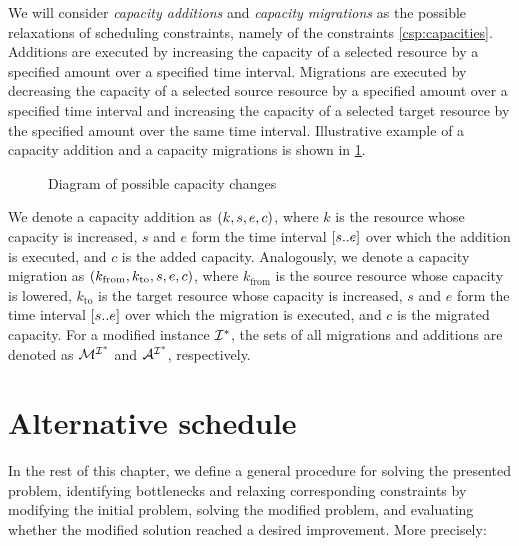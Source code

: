 We will consider \emph{capacity additions} and \emph{capacity migrations} as the possible relaxations
of scheduling constraints, namely of the constraints \eqref{csp:capacities}.
Additions are executed by increasing the capacity of a selected resource
by a specified amount over a specified time interval.
Migrations are executed by decreasing the capacity of a selected source resource
by a specified amount over a specified time interval
and increasing the capacity of a selected target resource
by the specified amount over the same time interval.
Illustrative example of a capacity addition and a capacity migrations is shown in \cref{fig:CapacityChanges}.

\begin{figure}
    \centering
    \caption{Diagram of possible capacity changes}
    \label{fig:CapacityChanges}
\end{figure}

We denote a capacity addition as $(k, s, e, c)$, where
$k$ is the resource whose capacity is increased,
$s$ and $e$ form the time interval $[{s}..{e}]$ over which the addition is executed, and
$c$ is the added capacity.
Analogously, we denote a capacity migration as $(k_{\text{from}}, k_{\text{to}}, s, e, c)$, where
$k_{\text{from}}$ is the source resource whose capacity is lowered,
$k_{\text{to}}$ is the target resource whose capacity is increased,
$s$ and $e$ form the time interval $[{s}..{e}]$ over which the migration is executed, and
$c$ is the migrated capacity.
For a modified instance $\mathcal{I}^*$, the sets of all migrations and additions are denoted as
$\mathcal{M}^{\mathcal{I}^*}$ and $\mathcal{A}^{\mathcal{I}^*}$, respectively.

\section{Alternative schedule} \label{sec:problem-statement/alternative-schedule}

In the rest of this chapter, we define a general procedure for solving the presented problem,
identifying bottlenecks and relaxing corresponding constraints by modifying the initial problem,
solving the modified problem,
and evaluating whether the modified solution reached a desired improvement.
More precisely:

